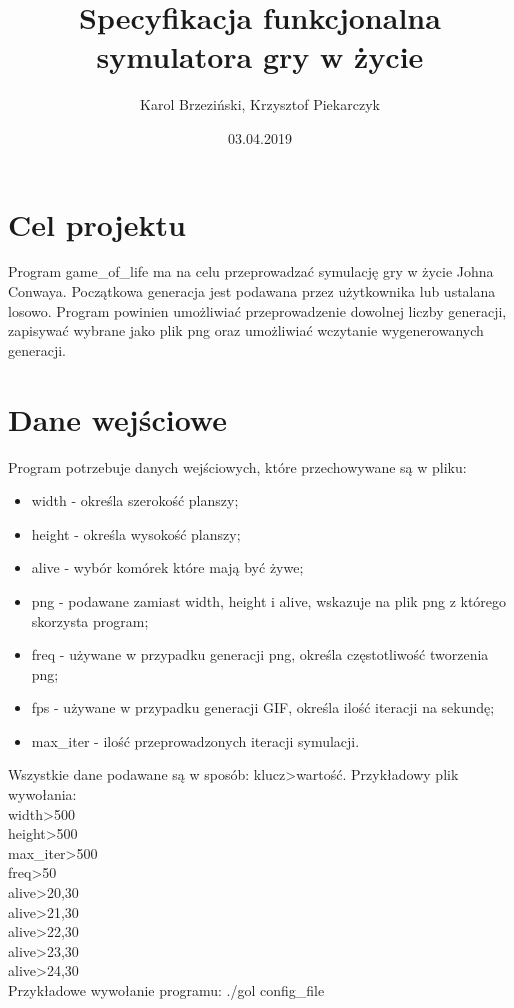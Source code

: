 \documentclass[12pt]{article}
\title{Specyfikacja funkcjonalna symulatora gry w życie}
\author{Karol Brzeziński, Krzysztof Piekarczyk}
\date{03.04.2019}
\begin{document}
\maketitle


\section{Cel projektu}

Program game\_of\_life ma na celu przeprowadzać symulację gry w życie Johna Conwaya. Początkowa generacja jest podawana przez użytkownika lub ustalana losowo. Program powinien umożliwiać przeprowadzenie dowolnej liczby generacji, zapisywać wybrane jako plik png oraz umożliwiać wczytanie wygenerowanych generacji.


\section{Dane wejściowe}

Program potrzebuje danych wejściowych, które przechowywane są w pliku:
\begin{itemize}
	\item width - określa szerokość planszy;
	\item height - określa wysokość planszy;
	\item alive - wybór komórek które mają być żywe;
	\item png - podawane zamiast width, height i alive, wskazuje na plik png z którego skorzysta program;
	\item freq - używane w przypadku generacji png, określa częstotliwość tworzenia png;
	\item fps - używane w przypadku generacji GIF, określa ilość iteracji na sekundę;
	\item max\_iter - ilość przeprowadzonych iteracji symulacji.
\end{itemize}

Wszystkie dane podawane są w sposób: klucz\textgreater{}wartość.
Przykładowy plik wywołania:\\
width\textgreater{}500\\
height\textgreater{}500\\
max\_iter\textgreater{}500\\
freq\textgreater{}50\\
alive\textgreater{}20,30\\
alive\textgreater{}21,30\\
alive\textgreater{}22,30\\
alive\textgreater{}23,30\\
alive\textgreater{}24,30\\
Przykładowe wywołanie programu:	./gol config\_file
\end{document}

